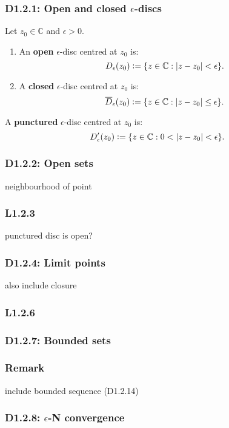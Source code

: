 \documentclass{article}
\newcommand{\deq}{\vcentcolon=}
\begin{document}
\begin{multicols*}{3}
\subsubsection*{D1.2.1: Open and closed $\epsilon$-discs}
Let $z_0\in\mathbb{C}$ and $\epsilon>0$.
\begin{enumerate}
    \item An \textbf{open} $\epsilon$-disc
    centred at $z_0$ is:
    $$D_{\epsilon}(z_0)
    \deq\{z\in\mathbb{C}:|z-z_0|<\epsilon\}.$$

    \item A \textbf{closed} $\epsilon$-disc
    centred at $z_0$ is:
    $$\overline{D}_{\epsilon}(z_0)
    \deq\{z\in\mathbb{C}:|z-z_0|\leq\epsilon\}.$$
\end{enumerate}
A \textbf{punctured} $\epsilon$-disc centred at $z_0$ is:
$$D'_{\epsilon}(z_0)\deq\{z\in\mathbb{C}:0<|z-z_0|<\epsilon\}.$$

\subsubsection*{D1.2.2: Open sets}
neighbourhood of point

\newcolumn

\subsubsection*{L1.2.3}
punctured disc is open?

\subsubsection*{D1.2.4: Limit points}
also include closure

\subsubsection*{L1.2.6}

\subsubsection*{D1.2.7: Bounded sets}

\subsubsection*{Remark}
include bounded sequence (D1.2.14)

\subsubsection*{D1.2.8: $\epsilon$-N convergence}


\end{multicols*}
\end{document}
